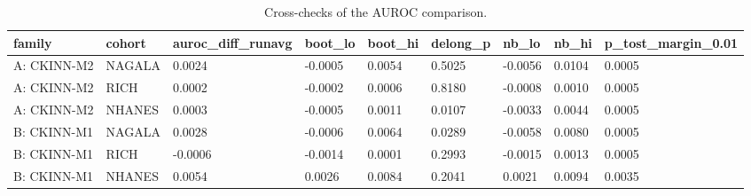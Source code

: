 \begin{table}[ht]
\centering
\scriptsize
\caption{Cross-checks of the AUROC comparison.}
\label{tab:h1x}
\begin{tabular}{lllllllll}
\toprule
family & cohort & auroc\_diff\_runavg & boot\_lo & boot\_hi & delong\_p & nb\_lo & nb\_hi & p\_tost\_margin\_0.01 \\
\midrule
A: CKINN-M2 & NAGALA & 0.0024 & -0.0005 & 0.0054 & 0.5025 & -0.0056 & 0.0104 & 0.0005 \\
A: CKINN-M2 & RICH & 0.0002 & -0.0002 & 0.0006 & 0.8180 & -0.0008 & 0.0010 & 0.0005 \\
A: CKINN-M2 & NHANES & 0.0003 & -0.0005 & 0.0011 & 0.0107 & -0.0033 & 0.0044 & 0.0005 \\
B: CKINN-M1 & NAGALA & 0.0028 & -0.0006 & 0.0064 & 0.0289 & -0.0058 & 0.0080 & 0.0005 \\
B: CKINN-M1 & RICH & -0.0006 & -0.0014 & 0.0001 & 0.2993 & -0.0015 & 0.0013 & 0.0005 \\
B: CKINN-M1 & NHANES & 0.0054 & 0.0026 & 0.0084 & 0.2041 & 0.0021 & 0.0094 & 0.0035 \\
\bottomrule
\end{tabular}
\end{table}
